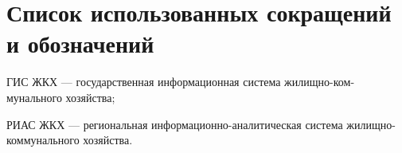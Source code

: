 \section*{Список использованных сокращений и обозначений}

ГИС ЖКХ --- государственная информационная система жилищно-ком-\linebreak мунального хозяйства;

РИАС ЖКХ --- региональная информационно-аналитическая система жилищно-коммунального хозяйства.

\clearpage
\newpage